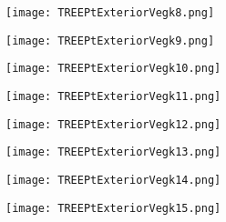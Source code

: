 \documentclass[pdf]{beamer}
\begin{document}
\begin{frame}
\begin{figure}[!h]
\centering
\texttt{[image: TREEPtExteriorVegk8.png]}
\end{figure}
\end{frame}

\begin{frame}
\begin{figure}[!h]
\centering
\texttt{[image: TREEPtExteriorVegk9.png]}
\end{figure}
\end{frame}

\begin{frame}
\begin{figure}[!h]
\centering
\texttt{[image: TREEPtExteriorVegk10.png]}
\end{figure}
\end{frame}

\begin{frame}
\begin{figure}[!h]
\centering
\texttt{[image: TREEPtExteriorVegk11.png]}
\end{figure}
\end{frame}

\begin{frame}
\begin{figure}[!h]
\centering
\texttt{[image: TREEPtExteriorVegk12.png]}
\end{figure}
\end{frame}

\begin{frame}
\begin{figure}[!h]
\centering
\texttt{[image: TREEPtExteriorVegk13.png]}
\end{figure}
\end{frame}

\begin{frame}
\begin{figure}[!h]
\centering
\texttt{[image: TREEPtExteriorVegk14.png]}
\end{figure}
\end{frame}

\begin{frame}
\begin{figure}[!h]
\centering
\texttt{[image: TREEPtExteriorVegk15.png]}
\end{figure}
\end{frame}
\end{document}
